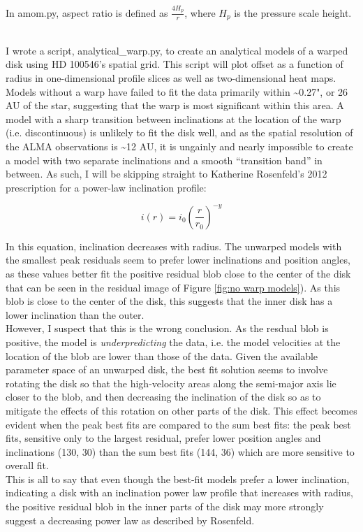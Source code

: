 \documentclass[a4paper]{tufte-handout}
\begin{document}
\hrulefill


In amom.py, aspect ratio is defined as $\frac{4H_p}{r}$, where $H_p$ is the pressure scale height.

\\
I wrote a script, analytical\_warp.py, to create an analytical models of a warped disk using HD 100546's spatial grid. This script will plot offset as a function of radius in one-dimensional profile slices as well as two-dimensional heat maps. Models without a warp have failed to fit the data primarily within \textasciitilde0.27", or 26 AU of the star, suggesting that the warp is most significant within this area. A model with a sharp transition between inclinations at the location of the warp (i.e. discontinuous) is unlikely to fit the disk well, and as the spatial resolution of the ALMA observations is \textasciitilde12 AU, it is ungainly and nearly impossible to create a model with two separate inclinations and a smooth ``transition band'' in between. As such, I will be skipping straight to Katherine Rosenfeld's \citep{Rosenfeld12} 2012 prescription for a power-law inclination profile:

\begin{equation}
  \label{eq:rosenfeld i}
  i(r)=i_0(\frac{r}{r_0})^{-y}
\end{equation}

\label{par:power law}
In this equation, inclination decreases with radius. The unwarped models with the smallest peak residuals seem to prefer lower inclinations and position angles, as these values better fit the positive residual blob close to the center of the disk that can be seen in the residual image of Figure \ref{fig:no warp models}). As this blob is close to the center of the disk, this suggests that the inner disk has a lower inclination than the outer. \\
However, I suspect that this is the wrong conclusion. As the resdual blob is positive, the model is \textit{underpredicting} the data, i.e. the model velocities at the location of the blob are lower than those of the data. Given the available parameter space of an unwarped disk, the best fit solution seems to involve rotating the disk so that the high-velocity areas along the semi-major axis lie closer to the blob, and then decreasing the inclination of the disk so as to mitigate the effects of this rotation on other parts of the disk. This effect becomes evident when the peak best fits are compared to the sum best fits: the peak best fits, sensitive only to the largest residual, prefer lower position angles and inclinations (130, 30) than the sum best fits (144, 36) which are more sensitive to overall fit. \\
This is all to say that even though the best-fit models prefer a lower inclination, indicating a disk with an inclination power law profile that increases with radius, the positive residual blob in the inner parts of the disk may more strongly suggest a decreasing power law as described by Rosenfeld.
\end{document}
